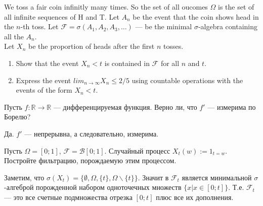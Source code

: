 \begin{problem}
We toss a fair coin infinitly many times. So the set of all oucomes $\Omega$ is the set of all infinite sequences of H and T. Let $A_{n}$ be the event that the coin shows head in the $n$-th toss. Let $\mathcal{F}=\sigma(A_{1},A_{2},A_{3},\ldots)$ — be the minimal $\sigma$-algebra containing all the $A_{n}$. \\
Let $X_{n}$ be the proportion of heads after the first $n$ tosses.
\begin{enumerate}
\item Show that the event $X_{n}<t$ is contained in $\mathcal{F}$ for all $n$ and $t$. \\
\item Express the event $lim_{n\to\infty}X_{n}\le 2/5$ using countable operations with the events of the form $X_{n}<t$.
\end{enumerate}

\begin{sol}

\end{sol}
\end{problem}

\begin{problem}
Пусть $f:\mathbb{R}\to\mathbb{R}$ — дифференцируемая функция. Верно ли, что $f'$ — измерима по Борелю?

\begin{sol}
Да. $ f' $ — непрерывна, а следовательно, измерима.
\end{sol}
\end{problem}

\begin{problem}
Пусть $\Omega=[0;1]$, $ \mathcal{F}=\mathcal{B}[0;1] $. Случайный процесс $X_{t}(w):=1_{t=w}$. Постройте фильтрацию, порождаемую этим процессом.

\begin{sol}
Заметим, что $\sigma(X_{t})=\{\emptyset,\Omega,\{t\},\Omega\backslash\{t\}\}$. Значит в $ \mathcal{F}_{t} $ является минимальной $\sigma  $-алгеброй порожденной набором одноточечных множеств $\{x|x\in [0;t]\}$. Т.е. $\mathcal{F}_{t}$ — это все счетные подмножества отрезка $[0;t]$ плюс все их дополнения.
\end{sol}
\end{problem}

